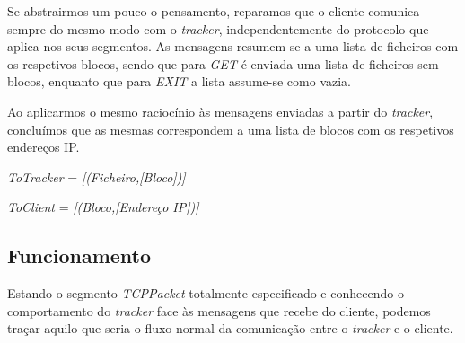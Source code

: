         Se abstrairmos um pouco o pensamento, reparamos que o cliente comunica sempre do mesmo modo com o \textit{tracker}, independentemente do protocolo que aplica nos seus segmentos. As mensagens resumem-se a uma lista de ficheiros com os respetivos blocos, sendo que para \textit{GET} é enviada uma lista de ficheiros sem blocos, enquanto que para \textit{EXIT} a lista assume-se como vazia.

        Ao aplicarmos o mesmo raciocínio às mensagens enviadas a partir do \textit{tracker}, concluímos que as mesmas correspondem a uma lista de blocos com os respetivos endereços IP.

        \begin{center}
            
            \textit{ToTracker} = \textit{[(Ficheiro,[Bloco])]} 
            
            \textit{ToClient} = \textit{[(Bloco,[Endereço IP])]}
        
        \end{center}

    \subsection{Funcionamento}

        Estando o segmento \textit{TCPPacket} totalmente especificado e conhecendo o comportamento do \textit{tracker} face às mensagens que recebe do cliente, podemos traçar aquilo que seria o fluxo normal da comunicação entre o \textit{tracker} e o cliente.

